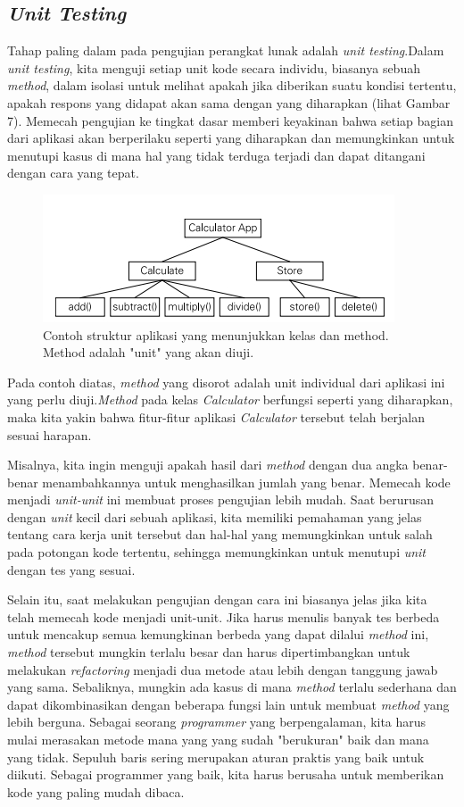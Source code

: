 \documentclass[a4paper,twoside]{article}
\begin{document}
\begin{enumerate}
\section*{\textit{Unit Testing}}
Tahap paling dalam pada pengujian perangkat lunak adalah \textit{unit testing}.Dalam \textit{unit testing}, kita menguji setiap unit kode secara individu, biasanya sebuah \textit{method}, dalam isolasi untuk melihat apakah jika diberikan suatu kondisi tertentu, apakah respons yang didapat akan sama dengan yang diharapkan (lihat Gambar 7). Memecah pengujian ke tingkat dasar memberi keyakinan bahwa setiap bagian dari aplikasi akan berperilaku seperti yang diharapkan dan memungkinkan untuk menutupi kasus di mana hal yang tidak terduga terjadi dan dapat ditangani dengan cara yang tepat.
\begin{figure}[h!]
	\includegraphics[scale=1.5]{../DokumenSkripsi/gambar/unittest}
	\centering
	\caption{Contoh struktur aplikasi yang menunjukkan kelas dan method. Method adalah "unit" yang akan diuji.}
\end{figure}

Pada contoh diatas, \textit{method} yang disorot adalah unit individual dari aplikasi ini yang perlu diuji.\textit{Method} pada kelas \textit{Calculator} berfungsi seperti yang diharapkan, maka kita yakin bahwa fitur-fitur aplikasi \textit{Calculator} tersebut telah berjalan sesuai harapan.

Misalnya, kita ingin menguji apakah hasil dari \textit{method} dengan dua angka benar-benar menambahkannya untuk menghasilkan jumlah yang benar. Memecah kode menjadi \textit{unit-unit} ini membuat proses pengujian lebih mudah. Saat berurusan dengan \textit{unit} kecil dari sebuah aplikasi, kita memiliki pemahaman yang jelas tentang cara kerja unit tersebut dan hal-hal yang memungkinkan untuk salah pada potongan kode tertentu, sehingga memungkinkan untuk menutupi \textit{unit} dengan tes yang sesuai.

Selain itu, saat melakukan pengujian dengan cara ini biasanya jelas jika kita telah memecah kode menjadi unit-unit. Jika harus menulis banyak tes berbeda untuk mencakup semua kemungkinan berbeda yang dapat dilalui \textit{method} ini, \textit{method} tersebut mungkin terlalu besar dan harus dipertimbangkan untuk melakukan \textit{refactoring} menjadi dua metode atau lebih dengan tanggung jawab yang sama. Sebaliknya, mungkin ada kasus di mana \textit{method} terlalu sederhana dan dapat dikombinasikan dengan beberapa fungsi lain untuk membuat \textit{method} yang lebih berguna. Sebagai seorang \textit{programmer} yang berpengalaman, kita harus mulai merasakan metode mana yang yang sudah "berukuran" baik dan mana yang tidak. Sepuluh baris sering merupakan aturan praktis yang baik untuk diikuti. Sebagai programmer yang baik, kita harus berusaha untuk memberikan kode yang paling mudah dibaca.


\end{enumerate}
\end{document}
